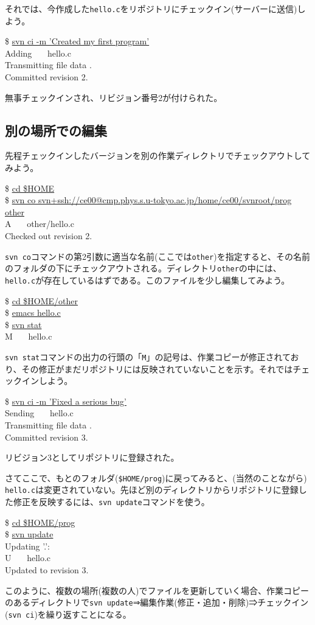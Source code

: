 \documentclass[a4j]{jsbook}
\newcommand{\prompt}{\$ }
\newenvironment{commandline2}{%
  \begin{tcolorbox}\tt%
}{%
  \end{tcolorbox}%
}
\begin{document}
それでは、今作成した{\tt hello.c}をリポジトリにチェックイン(サーバーに送信)しよう。
\begin{commandline2}
\prompt \underline{svn ci -m 'Created my first program'} \\
Adding \ \ \ hello.c \\
Transmitting file data . \\
Committed revision 2.
\end{commandline2} \noindent
無事チェックインされ、リビジョン番号2が付けられた。

\subsection{別の場所での編集}

先程チェックインしたバージョンを別の作業ディレクトリでチェックアウトしてみよう。
\begin{commandline2}
\prompt \underline{cd \$HOME} \\
\prompt \underline{svn co svn+ssh://ce00@cmp.phys.s.u-tokyo.ac.jp/home/ce00/svnroot/prog other} \\
A \ \ \ other/hello.c \\
Checked out revision 2.
\end{commandline2} \noindent
{\tt svn co}コマンドの第2引数に適当な名前(ここでは{\tt other})を指定すると、その名前のフォルダの下にチェックアウトされる。ディレクトリ{\tt other}の中には、{\tt hello.c}が存在しているはずである。このファイルを少し編集してみよう。
\begin{commandline2}
\prompt \underline{cd \$HOME/other} \\
\prompt \underline{emacs hello.c} \\
\prompt \underline{svn stat} \\
M \ \ \ hello.c
\end{commandline2} \noindent
{\tt svn stat}コマンドの出力の行頭の「{\tt M}」の記号は、作業コピーが修正されており、その修正がまだリポジトリには反映されていないことを示す。それではチェックインしよう。
\begin{commandline2}
\prompt \underline{svn ci -m 'Fixed a serious bug'} \\
Sending \ \ \ hello.c \\
Transmitting file data . \\
Committed revision 3.
\end{commandline2} \noindent
リビジョン3としてリポジトリに登録された。

さてここで、もとのフォルダ({\tt \$HOME/prog})に戻ってみると、(当然のことながら) {\tt hello.c}は変更されていない。先ほど別のディレクトリからリポジトリに登録した修正を反映するには、{\tt svn update}コマンドを使う。
\begin{commandline2}
\prompt \underline{cd \$HOME/prog} \\
\prompt \underline{svn update} \\
Updating '.': \\
U \ \ \ hello.c \\
Updated to revision 3.
\end{commandline2} \noindent
このように、複数の場所(複数の人)でファイルを更新していく場合、作業コピーのあるディレクトリで{\tt svn update}⇒編集作業(修正・追加・削除)⇒チェックイン({\tt svn ci})を繰り返すことになる。
\end{document}
